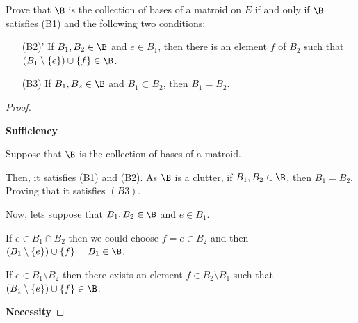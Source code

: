 \prob
{
    Prove that $\B$ is the collection of bases of a matroid on 
    $E$ if and only if $\B$ satisfies (B1) and the following two conditions:
    
    \begin{itemize}
        \item[(B2)'] If $B_1, B_2 \in \B$ and $e \in B_1$, then there is an element $f$ of
                        $B_2$ such that $(B_1 \setminus \{e\}) \cup \{f\} \in \B$.
                        
        \item[(B3)] If $B_1, B_2 \in \B$ and $B_1 \subset B_2$, then $B_1 = B_2$.
    \end{itemize}
}

\begin{proof}
    $\,$\pn
    
    \textbf{Sufficiency}\pn
        
    Suppose that $\B$ is the collection of bases of a matroid.\pn
    
    Then, it satisfies (B1) and (B2). As $\B$ is a clutter, if $B_1, B_2 \in \B$, then
    $B_1 = B_2$. Proving that it satisfies $(B3)$.\pn 
    
    Now, lets suppose that $B_1, B_2 \in \B$ and $e \in B_1$.\pn 
    
    If $e \in B_1 \cap B_2$ then we could choose $f = e \in B_2$ and then 
    $(B_1 \setminus \{e\}) \cup \{f\} = B_1 \in \B$.\pn
    
    If $e \in B_1 \setminus B_2$ then there exists an element $f \in B_2 \setminus B_1$ such that
    $(B_1 \setminus \{e\}) \cup \{ f \} \in \B$.\pn
    
    \textbf{Necessity}
\end{proof}